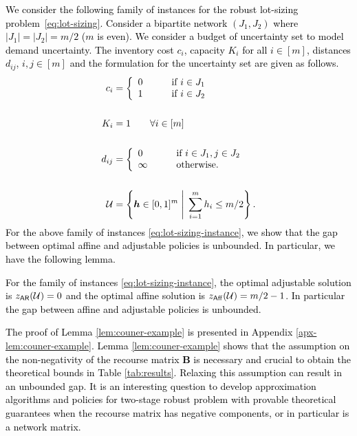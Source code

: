 \documentclass[moor]{informs1}              %
\newcommand{\mb}[1]{\ensuremath{\boldsymbol{#1}}}
\newcommand*{\red}{\textcolor{black}}
\begin{document}
\vspace{2mm}

\red{
We consider the following family of instances for the robust lot-sizing problem~\eqref{eq:lot-sizing}. Consider a bipartite network $(J_1, J_2)$ where $ \vert J_1 \vert = \vert J_2 \vert = m/2$ ($m$ is even). We consider a budget of uncertainty set to model demand uncertainty. The inventory cost $c_i$, capacity $K_i$ for all $i\in [m]$, distances $d_{ij}$, $i,j \in [m]$ and the formulation for the uncertainty set are given as follows.
\begin{equation}\label{eq:lot-sizing-instance}
\begin{aligned}
c_i&= \left\{
    \begin{array}{ll}
        0 & \qquad\mbox{if } i \in J_1 \\
        1 & \qquad \mbox{if } i \in J_2
    \end{array}
\right. \\
& \\
K_i &=1 \qquad \forall  i \in [m] \\
& \\
d_{ij}&= \left\{
    \begin{array}{ll}
        0 & \qquad\mbox{if } i \in J_1, j \in J_2 \\
        \infty & \qquad \mbox{otherwise}.
    \end{array}
\right. \\
& \\
{\cal U} & = \left\{ \mb h \in [0,1]^{m} \;  \Bigg\vert \; \sum_{i=1}^m h_i \leq m/2 \right\}.
 \end{aligned}
 \end{equation}
For the above family of instances \eqref{eq:lot-sizing-instance}, we show that the gap between optimal affine and adjustable policies is unbounded. In particular, we have the following lemma.
\begin{lemma} \label{lem:couner-example}
For the family of instances \eqref{eq:lot-sizing-instance}, the optimal adjustable solution is $ z_{\sf AR}({\cal U}) = 0$ and the optimal affine solution is $ z_{\sf Aff}({\cal U}) = m/2-1$. In particular the gap between affine and adjustable policies is unbounded.
\end{lemma}
The proof of Lemma \ref{lem:couner-example} is presented in Appendix  \ref{apx-lem:couner-example}. Lemma \ref{lem:couner-example} shows that the assumption on the non-negativity of the recourse matrix $\mb B$ is necessary and crucial to obtain the theoretical bounds in  Table \ref{tab:results}. Relaxing this assumption can result in an unbounded gap. It is an interesting question to develop approximation algorithms and policies for two-stage robust problem with provable theoretical guarantees when the recourse matrix has negative components, or in particular is a network matrix.
}
\end{document}
